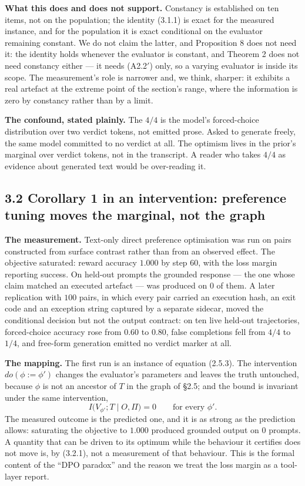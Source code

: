\documentclass[11pt,a4paper]{article}
\begin{document}
\textbf{What this does and does not support.} Constancy is established on ten items, not
on the population; the identity (3.1.1) is exact for the measured instance, and for
the population it is exact conditional on the evaluator remaining constant. We do
not claim the latter, and Proposition 8 does not need it: the identity holds
whenever the evaluator is constant, and Theorem 2 does not need constancy either ---
it needs (A2.2\('\)) only, so a varying evaluator is inside its scope. The
measurement's role is narrower and, we think, sharper: it exhibits a real artefact
at the extreme point of the section's range, where the information is zero by
constancy rather than by a limit.

\textbf{The confound, stated plainly.} The \(4/4\) is the model's forced-choice
distribution over two verdict tokens, not emitted prose. Asked to generate freely,
the same model committed to no verdict at all. The optimism lives in the prior's
marginal over verdict tokens, not in the transcript. A reader who takes \(4/4\) as
evidence about generated text would be over-reading it.

\subsection{3.2 Corollary 1 in an intervention: preference tuning moves the marginal, not the graph}\label{corollary-1-in-an-intervention-preference-tuning-moves-the-marginal-not-the-graph}

\textbf{The measurement.} Text-only direct preference optimisation was run on pairs
constructed from surface contrast rather than from an observed effect. The
objective saturated: reward accuracy \(1.000\) by step \(60\), with the loss margin
reporting success. On held-out prompts the grounded response --- the one whose claim
matched an executed artefact --- was produced on \(0\) of them. A later replication
with \(100\) pairs, in which every pair carried an execution hash, an exit code and
an exception string captured by a separate sidecar, moved the conditional
decision but not the output contract: on ten live held-out trajectories,
forced-choice accuracy rose from \(0.60\) to \(0.80\), false completions fell from
\(4/4\) to \(1/4\), and free-form generation emitted no verdict marker at all.

\textbf{The mapping.} The first run is an instance of equation (2.5.3). The intervention
\(do(\phi:=\phi')\) changes the evaluator's parameters and leaves the truth
untouched, because \(\phi\) is not an ancestor of \(T\) in the graph of §2.5; and the
bound is invariant under the same intervention,
\begin{equation}
I\big(V_{\phi'};T\mid O,\Pi\big)=0\qquad\text{for every }\phi'.
\tag{3.2.1}
\end{equation}
The measured outcome is the predicted one, and it is as strong as the prediction
allows: saturating the objective to \(1.000\) produced grounded output on \(0\)
prompts. A quantity that can be driven to its optimum while the behaviour it
certifies does not move is, by (3.2.1), not a measurement of that behaviour. This
is the formal content of the ``DPO paradox'' and the reason we treat the loss margin
as a tool-layer report.
\end{document}
